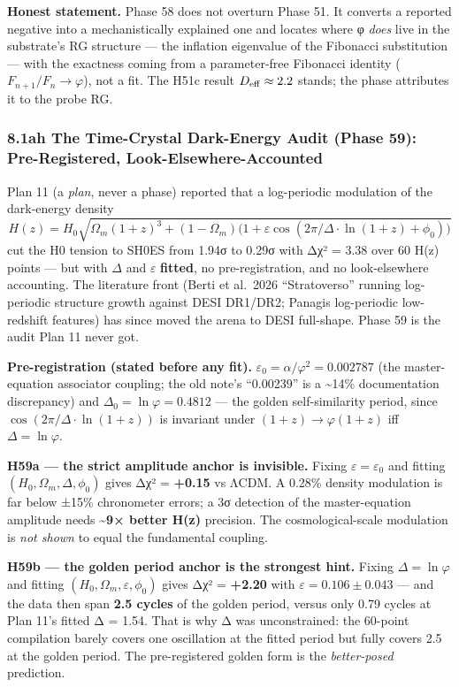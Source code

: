 \documentclass[
]{article}
\begin{document}
\textbf{Honest statement.} Phase 58 does not overturn Phase 51. It
converts a reported negative into a mechanistically explained one and
locates where φ \emph{does} live in the substrate's RG structure --- the
inflation eigenvalue of the Fibonacci substitution --- with the
exactness coming from a parameter-free Fibonacci identity
(\(F_{n+1}/F_n \to \varphi\)), not a fit. The H51c result
\(D_{\rm eff} \approx 2.2\) stands; the phase attributes it to the probe
RG.

\subsubsection{8.1ah The Time-Crystal Dark-Energy Audit (Phase 59):
Pre-Registered,
Look-Elsewhere-Accounted}\label{ah-the-time-crystal-dark-energy-audit-phase-59-pre-registered-look-elsewhere-accounted}

Plan 11 (a \emph{plan}, never a phase) reported that a log-periodic
modulation of the dark-energy density
\[H(z) = H_0\sqrt{\Omega_m(1+z)^3 + (1-\Omega_m)\big(1+\varepsilon\cos(2\pi/\Delta\cdot\ln(1+z)+\phi_0)\big)}\]
cut the H0 tension to SH0ES from 1.94σ to 0.29σ with Δχ² = 3.38 over 60
H(z) points --- but with \(\Delta\) and \(\varepsilon\) \textbf{fitted},
no pre-registration, and no look-elsewhere accounting. The literature
front (Berti et al.~2026 ``Stratoverso'' running log-periodic structure
growth against DESI DR1/DR2; Panagis log-periodic low-redshift features)
has since moved the arena to DESI full-shape. Phase 59 is the audit Plan
11 never got.

\textbf{Pre-registration (stated before any fit).}
\(\varepsilon_0 = \alpha/\varphi^2 = 0.002787\) (the master-equation
associator coupling; the old note's ``0.00239'' is a \textasciitilde14\%
documentation discrepancy) and \(\Delta_0 = \ln\varphi = 0.4812\) ---
the golden self-similarity period, since
\(\cos(2\pi/\Delta\cdot\ln(1+z))\) is invariant under
\((1+z)\to\varphi(1+z)\) iff \(\Delta = \ln\varphi\).

\textbf{H59a --- the strict amplitude anchor is invisible.} Fixing
\(\varepsilon = \varepsilon_0\) and fitting
\((H_0,\Omega_m,\Delta,\phi_0)\) gives Δχ² = \textbf{+0.15} vs ΛCDM. A
0.28\% density modulation is far below ±15\% chronometer errors; a 3σ
detection of the master-equation amplitude needs
\textbf{\textasciitilde9× better H(z)} precision. The cosmological-scale
modulation is \emph{not shown} to equal the fundamental coupling.

\textbf{H59b --- the golden period anchor is the strongest hint.} Fixing
\(\Delta = \ln\varphi\) and fitting
\((H_0,\Omega_m,\varepsilon,\phi_0)\) gives Δχ² = \textbf{+2.20} with
\(\varepsilon = 0.106\pm0.043\) --- and the data then span \textbf{2.5
cycles} of the golden period, versus only 0.79 cycles at Plan 11's
fitted Δ = 1.54. That is why Δ was unconstrained: the 60-point
compilation barely covers one oscillation at the fitted period but fully
covers 2.5 at the golden period. The pre-registered golden form is the
\emph{better-posed} prediction.
\end{document}
